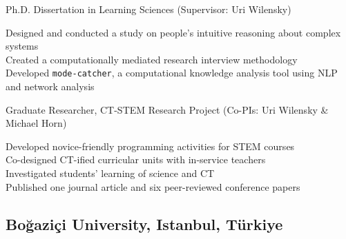 \documentclass[11pt,letterpaper]{report} %
\newcommand{\indentedsmall}[1]{\hspace{2pt}\small{#1}\normalsize}
\begin{document}
    \begin{tablist}

        \item[2020--26] \tab{}Ph.D. Dissertation in Learning Sciences (Supervisor: Uri Wilensky) \\

        \vspace{4pt}

        \indentedsmall{Designed and conducted a study on people's intuitive reasoning about complex systems}  \\
        \indentedsmall{Created a computationally mediated research interview methodology}  \\
        \indentedsmall{Developed \texttt{mode-catcher}, a computational knowledge analysis tool using NLP and network analysis} \\

        \vspace{6pt}

        \item[2016--22] \tab{}Graduate Researcher, CT-STEM Research Project (Co-PIs: Uri Wilensky \& Michael Horn) \\

        \vspace{4pt}

        \indentedsmall{Developed novice-friendly programming activities for STEM courses} \\
        \indentedsmall{Co-designed CT-ified curricular units with in-service teachers} \\
        \indentedsmall{Investigated students' learning of science and CT} \\
        \indentedsmall{Published one journal article and six peer-reviewed conference papers}

    \end{tablist}

    \subsection*{Boğaziçi University, Istanbul, Türkiye}
\end{document}
